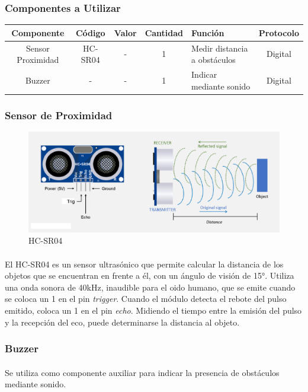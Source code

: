 \subsubsection{Componentes a Utilizar}

\begin{longtable}[]{|c|c|c|c|p{3.2cm}|c|}
	\toprule
	Componente & Código & Valor & Cantidad & Función &
	Protocolo\tabularnewline
	\midrule
	\endhead
	Sensor Proximidad & HC-SR04 & - & 1 & Medir distancia a obstáculos &
	Digital\tabularnewline
	Buzzer & - & - & 1 & Indicar mediante sonido & Digital\tabularnewline
	\bottomrule
\end{longtable}

\subsubsection{Sensor de Proximidad}

\begin{figure}[H]
	\centering
	\includegraphics[width=0.7\linewidth]{informe_2/encapsulado_HC-SR04}
	\caption{HC-SR04}
	\label{fig:encapsuladohc-sr04}
\end{figure}

\paragraph{}El HC-SR04 es un sensor ultrasónico que permite calcular la distancia de los
objetos que se encuentran en frente a él, con un ángulo de visión de \ang{15}. 
Utiliza una onda sonora de 40kHz, inaudible para el oido humano, que se emite
cuando se coloca un 1 en el pin \emph{trigger}. Cuando el módulo detecta el rebote 
del pulso emitido, coloca un 1 en el pin \emph{echo}. Midiendo el tiempo entre la 
emisión del pulso y la recepción del eco, puede determinarse la distancia al objeto.

\subsubsection{Buzzer}
\paragraph{}Se utiliza como componente auxiliar para indicar la presencia de obstáculos mediante sonido.

